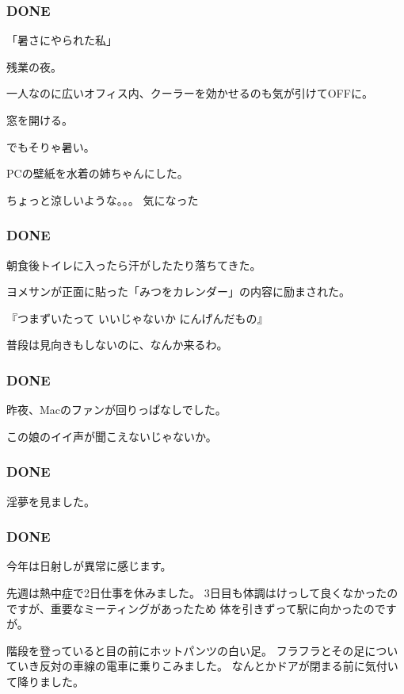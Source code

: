 \documentclass[11pt]{article}
\begin{document}
\subsubsection{\textbf{DONE}}
\label{sec-95_1_1}

「暑さにやられた私」

残業の夜。

一人なのに広いオフィス内、クーラーを効かせるのも気が引けてOFFに。

窓を開ける。

でもそりゃ暑い。

PCの壁紙を水着の姉ちゃんにした。

ちょっと涼しいような。。。 気になった
\subsubsection{\textbf{DONE}}
\label{sec-95_1_2}

朝食後トイレに入ったら汗がしたたり落ちてきた。

ヨメサンが正面に貼った「みつをカレンダー」の内容に励まされた。

『つまずいたって
    いいじゃないか
      にんげんだもの』

普段は見向きもしないのに、なんか来るわ。
\subsubsection{\textbf{DONE}}
\label{sec-95_1_3}

昨夜、Macのファンが回りっぱなしでした。

この娘のイイ声が聞こえないじゃないか。
\subsubsection{\textbf{DONE}}
\label{sec-95_1_4}

淫夢を見ました。
\subsubsection{\textbf{DONE}}
\label{sec-95_1_5}

今年は日射しが異常に感じます。

先週は熱中症で2日仕事を休みました。
3日目も体調はけっして良くなかったのですが、重要なミーティングがあったため
体を引きずって駅に向かったのですが。

階段を登っていると目の前にホットパンツの白い足。
フラフラとその足についていき反対の車線の電車に乗りこみました。
なんとかドアが閉まる前に気付いて降りました。
\end{document}
